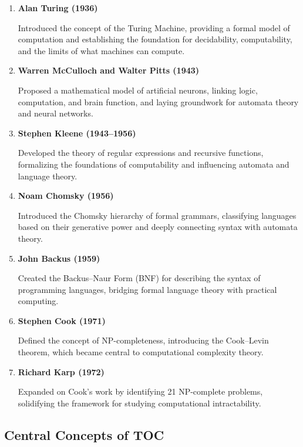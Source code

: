 \documentclass[12pt,a4paper,openany]{article}
\begin{document}
\begin{enumerate}
    \item \textbf{Alan Turing (1936)}
    
    Introduced the concept of the Turing Machine, providing a formal model of computation and establishing the foundation for decidability, computability, and the limits of what machines can compute.

    \item \textbf{Warren McCulloch and Walter Pitts (1943)} 
    
    Proposed a mathematical model of artificial neurons, linking logic, computation, and brain function, and laying groundwork for automata theory and neural networks.  
    
    \item \textbf{Stephen Kleene (1943--1956)} 
    
    Developed the theory of regular expressions and recursive functions, formalizing the foundations of computability and influencing automata and language theory.  
    
    \item \textbf{Noam Chomsky (1956)} 
    
    Introduced the Chomsky hierarchy of formal grammars, classifying languages based on their generative power and deeply connecting syntax with automata theory.  
    
    \item \textbf{John Backus (1959)} 
    
    Created the Backus–Naur Form (BNF) for describing the syntax of programming languages, bridging formal language theory with practical computing.  
    
    \item \textbf{Stephen Cook (1971)} 
    
    Defined the concept of NP-completeness, introducing the Cook–Levin theorem, which became central to computational complexity theory.  
    
    \item \textbf{Richard Karp (1972)} 
    
    Expanded on Cook’s work by identifying 21 NP-complete problems, solidifying the framework for studying computational intractability.  
\end{enumerate}

\subsection{Central Concepts of TOC}
\end{document}
